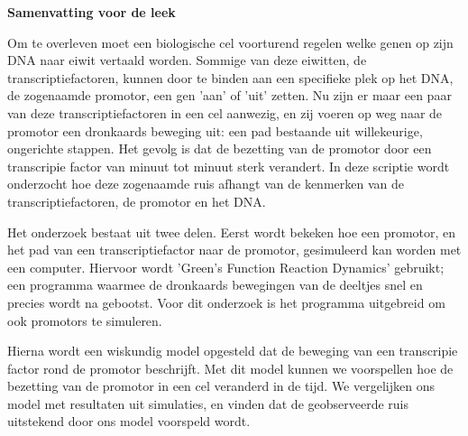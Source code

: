 \begin{center}
{\center \bf Samenvatting voor de leek}
\end{center}

Om te overleven moet een biologische cel voorturend regelen welke genen op zijn DNA naar eiwit vertaald worden. Sommige van deze eiwitten, de transcriptiefactoren, kunnen door te binden aan een specifieke plek op het DNA, de zogenaamde promotor, een gen 'aan' of 'uit' zetten. Nu zijn er maar een paar van deze transcriptiefactoren in een cel aanwezig, en zij voeren op weg naar de promotor een dronkaards beweging uit: een pad bestaande uit willekeurige, ongerichte stappen. Het gevolg is dat de bezetting van de promotor door een transcripie factor van minuut tot minuut sterk verandert.  In deze scriptie wordt onderzocht hoe deze zogenaamde ruis afhangt van de kenmerken van de transcriptiefactoren, de promotor en het DNA. 

Het onderzoek bestaat uit twee delen. Eerst wordt bekeken hoe een promotor,  en het pad van een transcriptiefactor naar de promotor, gesimuleerd kan worden met een computer. Hiervoor wordt 'Green's Function Reaction Dynamics' gebruikt; een programma waarmee de dronkaards bewegingen van de deeltjes snel en precies wordt na gebootst. Voor dit onderzoek is het programma uitgebreid om ook promotors te simuleren. 

Hierna wordt een wiskundig model opgesteld dat de beweging van een transcripie factor rond de promotor beschrijft. Met dit model kunnen we  voorspellen hoe de bezetting van de promotor in een cel veranderd in de tijd. We vergelijken ons model met resultaten uit simulaties, en vinden dat de geobserveerde ruis uitstekend door ons model voorspeld wordt.